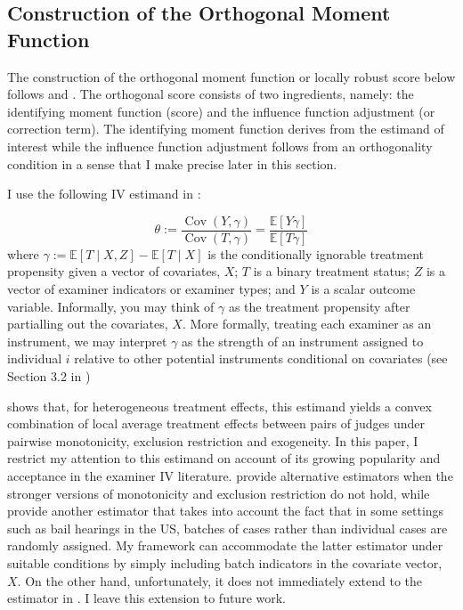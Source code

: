 \subsection{Construction of the Orthogonal Moment Function}

The construction of the orthogonal moment function or locally robust score below follows \citet{chernozhukov2022locally} and \citet{ichimura2022influence}. The orthogonal score consists of two ingredients, namely: the identifying moment function (score) and the influence function adjustment (or correction term). The identifying moment function derives from the estimand of interest while the influence function adjustment follows from an orthogonality condition in a sense that I make precise later in this section.

I use the following IV estimand in \citet{kolesarcowles}: 

\[
\theta:=\frac{\operatorname{Cov}(Y, \gamma)}{\operatorname{Cov}(T, \gamma)}=\frac{\mathbb{E}[Y \gamma]}{\mathbb{E}[T \gamma]}
\]
where $\gamma:=\mathbb{E}[T \mid X, Z]-\mathbb{E}[T \mid X]$ is the conditionally ignorable treatment propensity given a vector of covariates, $X$; $T$ is a binary treatment status; $Z$ is a vector of examiner indicators or examiner types; and $Y$ is a scalar outcome variable. Informally, you may think of $\gamma$ as the treatment propensity after partialling out the covariates, $X$. More formally, treating each examiner as an instrument, we may interpret $\gamma$ as the strength of an instrument assigned to individual $i$ relative to other potential instruments conditional on covariates (see Section 3.2 in \citet{kolesarcowles})
 
\citet{kolesarcowles} shows that, for heterogeneous treatment effects, this estimand yields a convex combination of local average treatment effects between pairs of judges under pairwise monotonicity, exclusion restriction and exogeneity. In this paper, I restrict my attention to this estimand on account of its growing popularity and acceptance in the examiner IV literature. \citet{frandsen2023judging} provide alternative estimators when the stronger versions of monotonicity and exclusion restriction do not hold, while \citet{Frandsen2023} provide another estimator that takes into account the fact that in some settings such as bail hearings in the US, batches of cases rather than individual cases are randomly assigned. My framework can accommodate the latter estimator under suitable conditions by simply including batch indicators in the covariate vector, $X$. On the other hand, unfortunately, it does not immediately extend to the estimator in \citet{frandsen2023judging}. I leave this extension to future work. 

